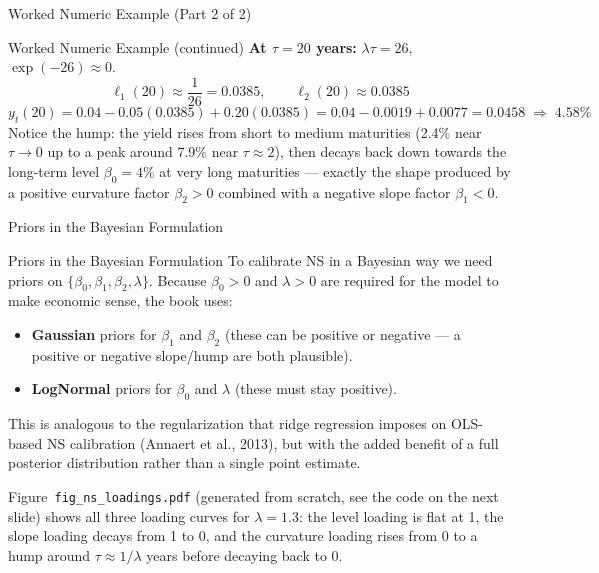 \documentclass[aspectratio=169,10pt]{beamer}
\begin{document}
\begin{frame}{Worked Numeric Example (Part 2 of 2)}

\begin{exampleblock}{Worked Numeric Example (continued)}
  \textbf{At $\tau = 20$ years:} $\lambda\tau = 26$, $\exp(-26) \approx 0$.
  \[
    \ell_1(20) \approx \frac{1}{26} = 0.0385, \qquad \ell_2(20) \approx 0.0385
  \]
  \[
    y_t(20) = 0.04 - 0.05(0.0385) + 0.20(0.0385) = 0.04 - 0.0019 + 0.0077 = 0.0458 \;\Rightarrow\; 4.58\%
  \]
  Notice the hump: the yield rises from short to medium maturities (2.4\%
  near $\tau\!\to\!0$ up to a peak around 7.9\% near $\tau\!\approx\!2$),
  then decays back down towards the long-term level $\beta_0 = 4\%$ at very
  long maturities --- exactly the shape produced by a positive curvature
  factor $\beta_2 > 0$ combined with a negative slope factor $\beta_1 < 0$.
\end{exampleblock}

\end{frame}

\begin{frame}{Priors in the Bayesian Formulation}

\begin{block}{Priors in the Bayesian Formulation}
  To calibrate NS in a Bayesian way we need priors on $\{\beta_0,\beta_1,\beta_2,\lambda\}$.
  Because $\beta_0 > 0$ and $\lambda > 0$ are required for the model to make
  economic sense, the book uses:
  \begin{itemize}
    \item \textbf{Gaussian} priors for $\beta_1$ and $\beta_2$ (these can be
      positive or negative --- a positive or negative slope/hump are both
      plausible).
    \item \textbf{LogNormal} priors for $\beta_0$ and $\lambda$ (these must
      stay positive).
  \end{itemize}
  This is analogous to the regularization that ridge regression imposes on
  OLS-based NS calibration (Annaert et al., 2013), but with the added
  benefit of a full posterior distribution rather than a single point
  estimate.
\end{block}

Figure~\texttt{fig\_ns\_loadings.pdf} (generated from scratch, see the code
on the next slide) shows all three loading curves for $\lambda = 1.3$:
the level loading is flat at 1, the slope loading decays from 1 to 0, and
the curvature loading rises from 0 to a hump around $\tau \approx 1/\lambda$
years before decaying back to 0.

\end{frame}
\end{document}
